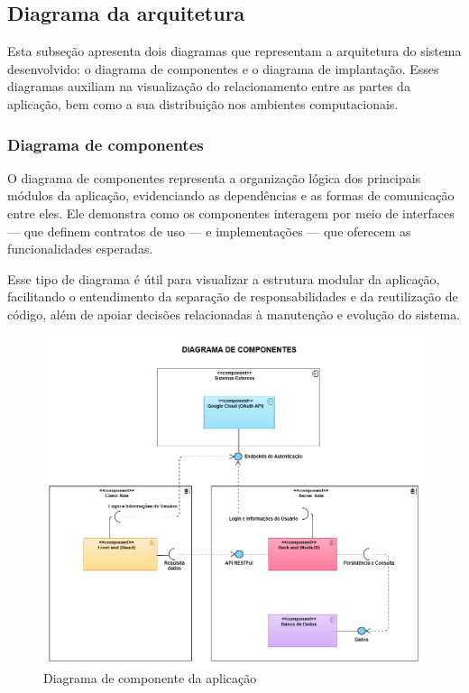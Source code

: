 \subsection{Diagrama da arquitetura}

Esta subseção apresenta dois diagramas que representam a arquitetura do sistema desenvolvido: o diagrama de componentes e o diagrama de implantação. Esses diagramas auxiliam na visualização do relacionamento entre as partes da aplicação, bem como a sua distribuição nos ambientes computacionais.

\subsubsection{Diagrama de componentes}

O diagrama de componentes representa a organização lógica dos principais módulos da aplicação, evidenciando as dependências e as formas de comunicação entre eles. Ele demonstra como os componentes interagem por meio de interfaces — que definem contratos de uso — e implementações — que oferecem as funcionalidades esperadas.

Esse tipo de diagrama é útil para visualizar a estrutura modular da aplicação, facilitando o entendimento da separação de responsabilidades e da reutilização de código, além de apoiar decisões relacionadas à manutenção e evolução do sistema.

\begin{figure}[htb]
  \centering
  \includegraphics[width=\textwidth]{cap04-desenvolvimento/images/4-3-2-1-diagrama-componentes}
  \caption{Diagrama de componente da aplicação}
  \label{fig:diagrama-componente}
\end{figure}


